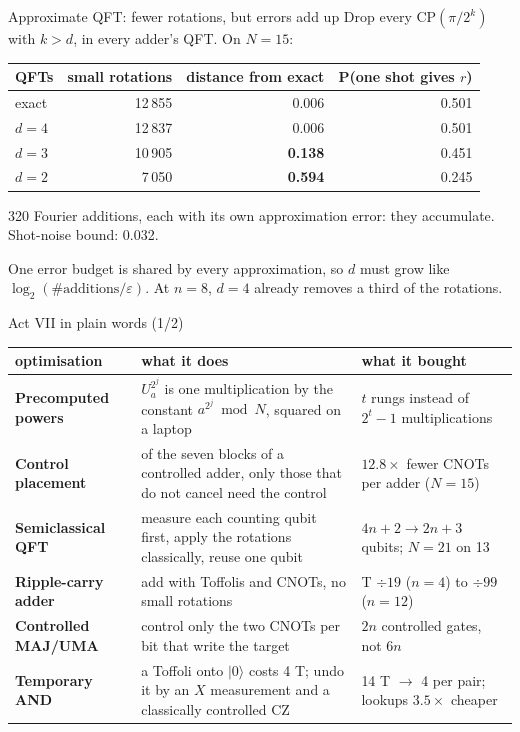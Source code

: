 \documentclass[aspectratio=169,11pt]{beamer}
\begin{document}
\setcounter{framenumber}{64}
\begin{frame}{Approximate QFT: fewer rotations, but errors add up}
  Drop every $\mathrm{CP}(\pi/2^k)$ with $k>d$, in every adder's QFT. On $N=15$:
  \vskip2mm
  \centering
  \renewcommand{\arraystretch}{1.2}
  \begin{tabular}{lrrr}
    \toprule
    QFTs & small rotations & distance from exact & P(one shot gives $r$) \\
    \midrule
    exact & 12\,855 & 0.006 & 0.501 \\
    $d=4$ & 12\,837 & 0.006 & 0.501 \\
    $d=3$ & 10\,905 & \textbf{0.138} & 0.451 \\
    $d=2$ & 7\,050 & \textbf{0.594} & 0.245 \\
    \bottomrule
  \end{tabular}
  \vskip2mm
  \raggedright{\small 320 Fourier additions, each with its own approximation error: they accumulate. Shot-noise bound: 0.032.}
  \begin{takeaway}One error budget is shared by every approximation, so $d$ must grow like $\log_2(\#\text{additions}/\varepsilon)$. At $n=8$, $d=4$ already removes a third of the rotations.\end{takeaway}
\end{frame}

\setcounter{framenumber}{65}
\begin{frame}{Act VII in plain words (1/2)}
  \centering\footnotesize
  \renewcommand{\arraystretch}{1.15}
  \begin{tabular}{@{}>{\raggedright}p{30mm}>{\raggedright}p{63mm}>{\raggedright\arraybackslash\leavevmode\color{cverm}}p{40mm}@{}}
    \toprule
    optimisation & what it does & \color{ink}what it bought \\
    \midrule
    \textbf{Precomputed powers} & $U_a^{2^j}$ is one multiplication by the constant $a^{2^j}\bmod N$, squared on a laptop & $t$ rungs instead of $2^t-1$ multiplications \\
    \textbf{Control placement} & of the seven blocks of a controlled adder, only those that do not cancel need the control & $12.8\times$ fewer CNOTs per adder ($N=15$) \\
    \textbf{Semiclassical QFT} & measure each counting qubit first, apply the rotations classically, reuse one qubit & $4n+2\to2n+3$ qubits; $N=21$ on 13 \\
    \textbf{Ripple-carry adder} & add with Toffolis and CNOTs, no small rotations & T $\div19$ ($n=4$) to $\div99$ ($n=12$) \\
    \textbf{Controlled MAJ/UMA} & control only the two CNOTs per bit that write the target & $2n$ controlled gates, not $6n$ \\
    \textbf{Temporary AND} & a Toffoli onto $|0\rangle$ costs 4 T; undo it by an $X$ measurement and a classically controlled CZ & 14 T $\to$ 4 per pair; lookups $3.5\times$ cheaper \\
    \bottomrule
  \end{tabular}
\end{frame}
\end{document}
